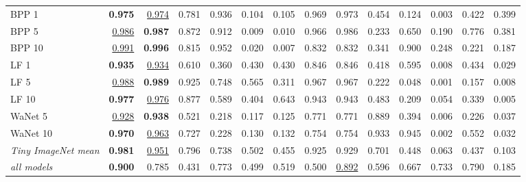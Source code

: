 \begin{table}[htbp]
\begin{adjustbox}{max width=\linewidth}
\begin{tabular}{lrrrrrrrrrrrrr}
BPP 1 & \textbf{0.975} & \underline{0.974} & 0.781 & 0.936 & \textcolor{black!45}{0.104} & \textcolor{black!45}{0.105} & 0.969 & 0.973 & \textcolor{black!45}{0.454} & \textcolor{black!45}{0.124} & \textcolor{black!45}{0.003} & \textcolor{black!45}{0.422} & \textcolor{black!45}{0.399} \\
BPP 5 & \underline{0.986} & \textbf{0.987} & 0.872 & 0.912 & \textcolor{black!45}{0.009} & \textcolor{black!45}{0.010} & 0.966 & 0.986 & \textcolor{black!45}{0.233} & 0.650 & \textcolor{black!45}{0.190} & 0.776 & \textcolor{black!45}{0.381} \\
BPP 10 & \underline{0.991} & \textbf{0.996} & 0.815 & 0.952 & \textcolor{black!45}{0.020} & \textcolor{black!45}{0.007} & 0.832 & 0.832 & \textcolor{black!45}{0.341} & 0.900 & \textcolor{black!45}{0.248} & \textcolor{black!45}{0.221} & \textcolor{black!45}{0.187} \\
LF 1 & \textbf{0.935} & \underline{0.934} & 0.610 & \textcolor{black!45}{0.360} & \textcolor{black!45}{0.430} & \textcolor{black!45}{0.430} & 0.846 & 0.846 & \textcolor{black!45}{0.418} & 0.595 & \textcolor{black!45}{0.008} & \textcolor{black!45}{0.434} & \textcolor{black!45}{0.029} \\
LF 5 & \underline{0.988} & \textbf{0.989} & 0.925 & 0.748 & 0.565 & \textcolor{black!45}{0.311} & 0.967 & 0.967 & \textcolor{black!45}{0.222} & \textcolor{black!45}{0.048} & \textcolor{black!45}{0.001} & \textcolor{black!45}{0.157} & \textcolor{black!45}{0.008} \\
LF 10 & \textbf{0.977} & \underline{0.976} & 0.877 & 0.589 & \textcolor{black!45}{0.404} & 0.643 & 0.943 & 0.943 & \textcolor{black!45}{0.483} & \textcolor{black!45}{0.209} & \textcolor{black!45}{0.054} & \textcolor{black!45}{0.339} & \textcolor{black!45}{0.005} \\
WaNet 5 & \underline{0.928} & \textbf{0.938} & 0.521 & \textcolor{black!45}{0.218} & \textcolor{black!45}{0.117} & \textcolor{black!45}{0.125} & 0.771 & 0.771 & 0.889 & \textcolor{black!45}{0.394} & \textcolor{black!45}{0.006} & \textcolor{black!45}{0.226} & \textcolor{black!45}{0.037} \\
WaNet 10 & \textbf{0.970} & \underline{0.963} & 0.727 & \textcolor{black!45}{0.228} & \textcolor{black!45}{0.130} & \textcolor{black!45}{0.132} & 0.754 & 0.754 & 0.933 & 0.945 & \textcolor{black!45}{0.002} & 0.552 & \textcolor{black!45}{0.032} \\
\rowcolor{black!8}\emph{Tiny ImageNet mean} & \textbf{0.981} & \underline{0.951} & 0.796 & 0.738 & 0.502 & \textcolor{black!45}{0.455} & 0.925 & 0.929 & 0.701 & \textcolor{black!45}{0.448} & \textcolor{black!45}{0.063} & \textcolor{black!45}{0.437} & \textcolor{black!45}{0.103} \\
\rowcolor{black!8}\emph{all models} & \textbf{0.900} & 0.785 & \textcolor{black!45}{0.431} & 0.773 & \textcolor{black!45}{0.499} & 0.519 & 0.500 & \underline{0.892} & 0.596 & 0.667 & 0.733 & 0.790 & \textcolor{black!45}{0.185} \\
\bottomrule
\end{tabular}
\end{adjustbox}
\end{table}
